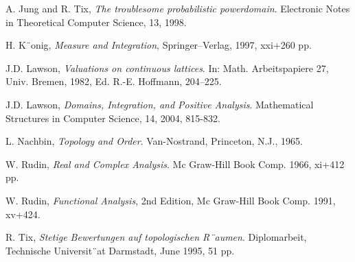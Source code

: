 \documentclass[12pt,a4paper]{article}
\theoremstyle{definition}
\theoremstyle{theorem}
\theoremstyle{definition}
\begin{document}
\begin{thebibliography}{99}
\begin{LTRitems}
A. Jung and R. Tix,  {\em The troublesome probabilistic powerdomain}. Electronic Notes in
Theoretical Computer Science, 13, 1998.

H. K¨onig,  {\em Measure and Integration}, Springer–Verlag, 1997, xxi+260 pp.

J.D. Lawson, {\em Valuations on continuous lattices}. In: Math. Arbeitspapiere 27, Univ. Bremen,
1982, Ed. R.-E. Hoffmann, 204–225.

J.D. Lawson, {\em Domains, Integration, and Positive Analysis}. Mathematical Structures in
Computer Science, 14, 2004, 815-832.

L. Nachbin, {\em Topology and Order}. Van-Nostrand, Princeton, N.J., 1965.

W. Rudin,  {\em Real and Complex Analysis}.  Mc Graw-Hill Book Comp. 1966, xi+412 pp.

W. Rudin,  {\em Functional Analysis},  2nd Edition, Mc Graw-Hill Book Comp.  1991,  xv+424.

R. Tix,  {\em Stetige Bewertungen auf topologischen R¨aumen}. Diplomarbeit, Technische Universit¨at
Darmstadt, June 1995, 51 pp.

\end{LTRitems}

\end{thebibliography}

\printindex
\end{document}
